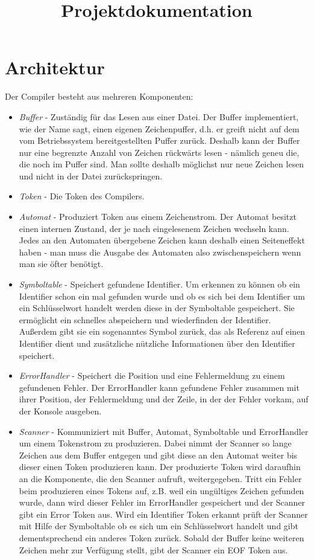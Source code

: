 \documentclass[a4paper,11pt,titlepage,openany,oneside]{scrbook}
\title{Projektdokumentation}
\author{}
\begin{document}
\maketitle

\tableofcontents
\newpage

\chapter{Architektur}

Der Compiler besteht aus mehreren Komponenten:
\begin{itemize}
    \item \textit{Buffer} - Zuständig für das Lesen aus einer Datei. Der Buffer implementiert, wie der Name sagt, einen eigenen Zeichenpuffer, d.h. er greift nicht auf dem vom Betriebssystem bereitgestellten Puffer zurück. Deshalb kann der Buffer nur eine begrenzte Anzahl von Zeichen rückwärts lesen - nämlich geneu die, die noch im Puffer sind. Man sollte deshalb möglichst nur neue Zeichen lesen und nicht in der Datei zurückspringen.
    \item \textit{Token} - Die Token des Compilers.
    \item \textit{Automat} - Produziert Token aus einem Zeichenstrom. Der Automat besitzt einen internen Zustand, der je nach eingelesenem Zeichen wechseln kann. Jedes an den Automaten übergebene Zeichen kann deshalb einen Seiteneffekt haben - man muss die Ausgabe des Automaten also zwischenspeichern wenn man sie öfter benötigt.
    \item \textit{Symboltable} - Speichert gefundene Identifier. Um erkennen zu können ob ein Identifier schon ein mal gefunden wurde und ob es sich bei dem Identifier um ein Schlüsselwort handelt werden diese in der Symboltable gespeichert. Sie ermöglicht ein schnelles abspeichern und wiederfinden der Identifier. Außerdem gibt sie ein sogenanntes Symbol zurück, das als Referenz auf einen Identifier dient und zusätzliche nützliche Informationen über den Identifier speichert.
    \item \textit{ErrorHandler} - Speichert die Position und eine Fehlermeldung zu einem gefundenen Fehler. Der ErrorHandler kann gefundene Fehler zusammen mit ihrer Position, der Fehlermeldung und der Zeile, in der der Fehler vorkam, auf der Konsole ausgeben.
    \item \textit{Scanner} - Kommuniziert mit Buffer, Automat, Symboltable und ErrorHandler um einem Tokenstrom zu produzieren. Dabei nimmt der Scanner so lange Zeichen aus dem Buffer entgegen und gibt diese an den Automat weiter bis dieser einen Token produzieren kann. Der produzierte Token wird daraufhin an die Komponente, die den Scanner aufruft, weitergegeben. Tritt ein Fehler beim produzieren eines Tokens auf, z.B. weil ein ungültiges Zeichen gefunden wurde, dann wird dieser Fehler im ErrorHandler gespeichert und der Scanner gibt ein Error Token aus. Wird ein Identifier Token erkannt prüft der Scanner mit Hilfe der Symboltable ob es sich um ein Schlüsselwort handelt und gibt dementsprechend ein anderes Token zurück. Sobald der Buffer keine weiteren Zeichen mehr zur Verfügung stellt, gibt der Scanner ein EOF Token aus.

\end{itemize}
\end{document}
